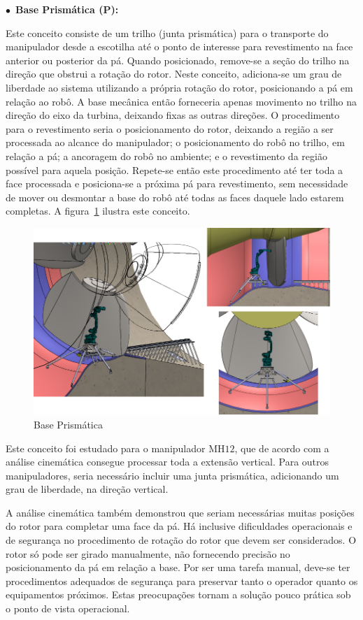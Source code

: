 $\bullet$~\textbf{Base Prismática (P):}

  Este conceito consiste de um trilho (junta prismática) para o transporte do
  manipulador desde a escotilha até o ponto de interesse para revestimento na
  face anterior ou posterior da pá. Quando posicionado, remove-se a seção
  do trilho na direção que obstrui a rotação do rotor. Neste conceito,
  adiciona-se um grau de liberdade ao sistema utilizando a própria rotação do
  rotor, posicionando a pá em relação ao robô. A base mecânica então forneceria
  apenas movimento no trilho na direção do eixo da turbina, deixando fixas as
  outras direções. O procedimento para o revestimento seria o posicionamento do
  rotor, deixando a região a ser processada ao alcance do manipulador; o
  posicionamento do robô no trilho, em relação a pá; a ancoragem do robô
  no ambiente; e o revestimento da região possível para aquela posição.
  Repete-se então este procedimento até ter toda a face processada e
  posiciona-se a próxima pá para revestimento, sem necessidade de mover ou
  desmontar a base do robô até todas as faces daquele lado estarem completas.  A
  figura~\ref{fig::base_p} ilustra este conceito.
  
  \begin{figure}[h!]
   \centering
   \includegraphics[width=0.8\columnwidth]{figs/bases/base_p}
   \caption{Base Prismática}
   \label{fig::base_p}
\end{figure}
  
  Este conceito foi estudado para o manipulador MH$12$, que de acordo com a
  análise cinemática consegue processar toda a extensão vertical. Para outros
  manipuladores, seria necessário incluir uma junta prismática, adicionando um
  grau de liberdade, na direção vertical.
  
  A análise cinemática também demonstrou que seriam necessárias muitas posições
  do rotor para completar uma face da pá. Há inclusive dificuldades operacionais e
  de segurança no procedimento de rotação do rotor que devem ser considerados. O
  rotor só pode ser girado manualmente, não fornecendo precisão no
  posicionamento da pá em relação a base. Por ser uma tarefa manual, deve-se ter
  procedimentos adequados de segurança para preservar tanto o operador quanto os
  equipamentos próximos. Estas preocupações tornam a solução pouco prática sob o
  ponto de vista operacional.

